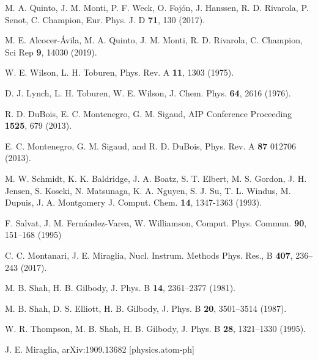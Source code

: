 \begin{thebibliography}{9}
M. A. Quinto, J. M. Monti, P. F. Weck, O. Fojón, J. Hanssen, R. D. Rivarola, 
P. Senot, C. Champion,
Eur. Phys. J. D \textbf{71}, 130 (2017). 

M. E. Alcocer-Ávila, M. A. Quinto, J. M. Monti, R. D. Rivarola, C. Champion,
Sci Rep \textbf{9}, 14030 (2019). 

W. E. Wilson, L. H. Toburen,
Phys. Rev. A \textbf{11}, 1303 (1975).

D. J. Lynch, L. H. Toburen, W. E. Wilson,
J. Chem. Phys. \textbf{64}, 2616 (1976).

R. D. DuBois, E. C. Montenegro, G. M. Sigaud,
AIP Conference Proceeding \textbf{1525}, 679 (2013).

E. C. Montenegro, G. M. Sigaud, and R. D. DuBois, 
Phys. Rev. A \textbf{87} 012706 (2013).

M. W. Schmidt, K. K. Baldridge, J. A. Boatz, S. T. Elbert, M. S. Gordon, 
J. H. Jensen, S. Koseki, N. Matsunaga, K. A. Nguyen, S. J. Su, T. L. Windus, 
M. Dupuis, J. A. Montgomery 
J. Comput. Chem. \textbf{14}, 1347-1363 (1993).

F. Salvat, J. M. Fern\'andez-Varea, W. Williamson,
Comput. Phys. Commun. \textbf{90}, 151--168 (1995)

C. C. Montanari, J. E. Miraglia,
Nucl. Instrum. Methods Phys. Res., B \textbf{407}, 236--243 (2017).

M. B. Shah, H. B. Gilbody,
J. Phys. B \textbf{14}, 2361--2377 (1981).

M. B. Shah, D. S. Elliott, H. B. Gilbody,
J. Phys. B \textbf{20}, 3501--3514 (1987).

W. R. Thompson, M. B. Shah, H. B. Gilbody,
J. Phys. B \textbf{28}, 1321--1330 (1995).

J. E. Miraglia,
arXiv:1909.13682 [physics.atom-ph]


\end{thebibliography}
